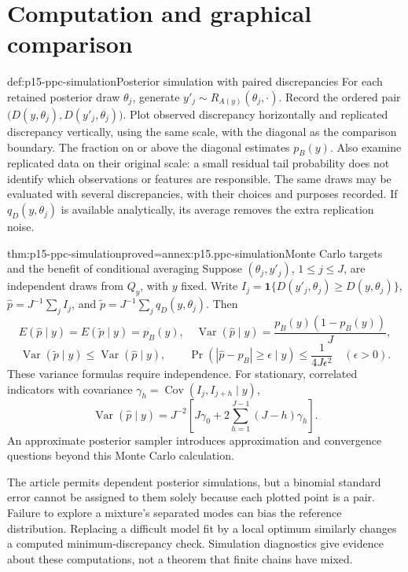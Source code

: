 \section{Computation and graphical comparison}
\label{sec:p15-ppc-computation}

\begin{hbmethod}{def:p15-ppc-simulation}{Posterior simulation with paired discrepancies}
For each retained posterior draw \(\theta_j\), generate
\(y'_j\sim R_{A(y)}(\theta_j,\cdot)\). Record the ordered pair
\(\bigl(D(y,\theta_j),D(y'_j,\theta_j)\bigr)\).
Plot observed discrepancy horizontally and replicated discrepancy vertically,
using the same scale, with the diagonal as the comparison boundary.
The fraction on or above the diagonal estimates \(p_B(y)\).
Also examine replicated data on their original scale: a small residual tail
probability does not identify which observations or features are responsible.
The same draws may be evaluated with several discrepancies, with their choices
and purposes recorded. If \(q_D(y,\theta_j)\) is available analytically,
its average removes the extra replication noise.
\end{hbmethod}

\begin{hbtheorem}{thm:p15-ppc-simulation}{proved=annex:p15.ppc-simulation}{Monte Carlo targets and the benefit of conditional averaging}
Suppose \((\theta_j,y'_j)\), \(1\leq j\leq J\), are independent draws
from \(Q_y\), with \(y\) fixed. Write
\(I_j=\mathbf1\{D(y'_j,\theta_j)\geq D(y,\theta_j)\}\),
\(\widehat p=J^{-1}\sum_j I_j\), and
\(\widetilde p=J^{-1}\sum_jq_D(y,\theta_j)\). Then
\[
 E(\widehat p\mid y)=E(\widetilde p\mid y)=p_B(y),\quad
 \operatorname{Var}(\widehat p\mid y)=\frac{p_B(y)(1-p_B(y))}{J},
\]
\[
 \operatorname{Var}(\widetilde p\mid y)
 \leq\operatorname{Var}(\widehat p\mid y),\qquad
 \Pr(|\widehat p-p_B|\geq\epsilon\mid y)
 \leq\frac1{4J\epsilon^2}\quad(\epsilon>0).
\]
These variance formulas require independence. For stationary, correlated
indicators with covariance \(\gamma_h=\operatorname{Cov}(I_j,I_{j+h}\mid y)\),
\[
 \operatorname{Var}(\widehat p\mid y)
 =J^{-2}\left[J\gamma_0+2\sum_{h=1}^{J-1}(J-h)\gamma_h\right].
\]
An approximate posterior sampler introduces approximation and convergence
questions beyond this Monte Carlo calculation.
\end{hbtheorem}

The article permits dependent posterior simulations, but a binomial standard
error cannot be assigned to them solely because each plotted point is a pair.
Failure to explore a mixture's separated modes can bias the reference
distribution. Replacing a difficult model fit by a local optimum similarly
changes a computed minimum-discrepancy check. Simulation diagnostics give
evidence about these computations, not a theorem that finite chains have mixed.

